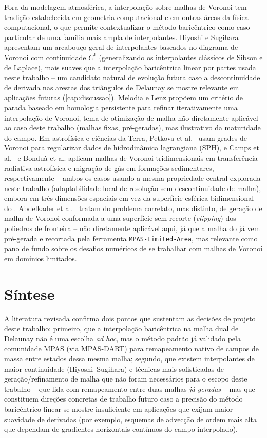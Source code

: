 Fora da modelagem atmosférica, a interpolação sobre malhas de Voronoi tem
tradição estabelecida em geometria computacional e em outras áreas da
física computacional, o que permite contextualizar o método baricêntrico
como caso particular de uma família mais ampla de interpolantes.
Hiyoshi e Sugihara \cite{hiyoshi2000continuity} apresentam um arcabouço
geral de interpolantes baseados no diagrama de Voronoi com continuidade
$C^1$ (generalizando os interpolantes clássicos de Sibson e de Laplace),
mais suaves que a interpolação baricêntrica linear por partes usada
neste trabalho -- um candidato natural de evolução futura caso a
descontinuidade de derivada nas arestas dos triângulos de Delaunay se
mostre relevante em aplicações futuras (\cref{cap:discussao}). Melodia e
Lenz \cite{melodia2019persistenthomology} propõem um critério de parada
baseado em homologia persistente para refinar iterativamente uma
interpolação de Voronoi, tema de otimização de malha não diretamente
aplicável ao caso deste trabalho (malhas fixas, pré-geradas), mas
ilustrativo da maturidade do campo. Em astrofísica e ciências da Terra,
Petkova et al.~\cite{petkova2017densitygridding} usam grades de Voronoi
para regularizar dados de hidrodinâmica lagrangiana (SPH), e Camps et
al.~\cite{camps2013radiativetransfer} e Bonduà et al.
\cite{bondua2017voronoi3d} aplicam malhas de Voronoi tridimensionais em
transferência radiativa astrofísica e migração de gás em formações
sedimentares, respectivamente -- ambos os casos usando a mesma
propriedade central explorada neste trabalho (adaptabilidade local de
resolução sem descontinuidade de malha), embora em três dimensões
espaciais em vez da superfície esférica bidimensional do \mpasa{}.
Abdelkader et al.~\cite{abdelkader2019vorocrust} tratam do problema
correlato, mas distinto, de geração de malha de Voronoi conformada a uma
superfície sem recorte (\emph{clipping}) dos poliedros de fronteira --
não diretamente aplicável aqui, já que a malha do \mpasa{} já vem
pré-gerada e recortada pela ferramenta \texttt{MPAS-Limited-Area}, mas
relevante como pano de fundo sobre os desafios numéricos de se trabalhar
com malhas de Voronoi em domínios limitados.

\section{Síntese}

A literatura revisada confirma dois pontos que sustentam as decisões de
projeto deste trabalho: primeiro, que a interpolação baricêntrica na
malha dual de Delaunay não é uma escolha \emph{ad hoc}, mas o método
padrão já validado pela comunidade MPAS (via MPAS-DART) para
remapeamento nativo de campos de massa entre estados dessa mesma malha;
segundo, que existem interpolantes de maior continuidade
(Hiyoshi--Sugihara) e técnicas mais sofisticadas de geração/refinamento
de malha que não foram necessários para o escopo deste trabalho -- que
lida com remapeamento entre duas malhas \emph{já geradas} -- mas que
constituem direções concretas de trabalho futuro caso a precisão do
método baricêntrico linear se mostre insuficiente em aplicações que
exijam maior suavidade de derivadas (por exemplo, esquemas de advecção
de ordem mais alta que dependam de gradientes horizontais contínuos do
campo interpolado).
